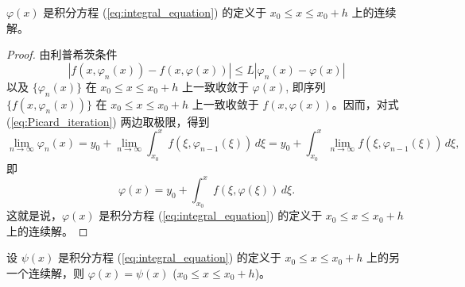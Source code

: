 \begin{proposition}[函数序列收敛项是原方程的解]\label{prop:Picard_limit_is_solution}
    $\varphi(x)$ 是积分方程 (\ref{eq:integral_equation}) 的定义于 $x_0 \le x \le x_0+h$ 上的连续解。
\end{proposition}
\begin{proof}
    由利普希茨条件
$$|f(x,\varphi_n(x))-f(x,\varphi(x))| \le L|\varphi_n(x)-\varphi(x)|$$
以及 $\{\varphi_n(x)\}$ 在 $x_0 \le x \le x_0+h$ 上一致收敛于 $\varphi(x)$, 即序列 $\{f(x,\varphi_n(x))\}$ 在 $x_0 \le x \le
x_0+h$ 上一致收敛于 $f(x,\varphi(x))$。因而，对式 (\ref{eq:Picard_iteration}) 两边取极限，得到
$$\lim_{n\to\infty} \varphi_n(x)=y_0+\lim_{n\to\infty}\int_{x_0}^{x} f(\xi,\varphi_{n-1}(\xi))\,d\xi = y_0+\int_{x_0}^{x} \lim_{n\to\infty}f(\xi,\varphi_{n-1}(\xi))\,d\xi,$$
即
$$\varphi(x)=y_0 + \int_{x_0}^{x} f(\xi,\varphi(\xi))\,d\xi.$$
这就是说，$\varphi(x)$ 是积分方程 (\ref{eq:integral_equation}) 的定义于 $x_0 \le x \le x_0+h$ 上的连续解。
\end{proof}

\begin{proposition}[唯一性]\label{prop:Picard_uniqueness}

设 $\psi(x)$ 是积分方程 (\ref{eq:integral_equation}) 的定义于 $x_0 \le x \le x_0+h$ 上的另一个连续解，则
$\varphi(x) = \psi(x)$ ($x_0 \le x \le x_0+h$)。

\end{proposition}

